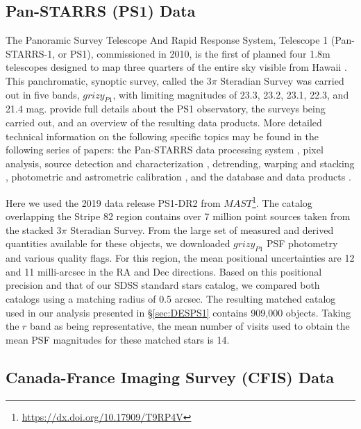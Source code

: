 \documentclass[fleqn,usenatbib]{mnras}
\begin{document}

\subsection{Pan-STARRS (PS1) Data} \label{ssec:ps1}
 
The Panoramic Survey Telescope And Rapid Response System, Telescope 1 (Pan-STARRS-1, or PS1), commissioned 
in 2010, is the first of planned four 1.8m telescopes designed to map three quarters of the entire sky visible from 
Hawaii \citep{2010SPIE.7733E..0EK}. This panchromatic, synoptic survey, called the 3$\pi$ Steradian Survey was 
carried out in five bands, $grizy_{P1}$, with limiting magnitudes of 23.3, 23.2, 23.1, 22.3, and 21.4 mag. 
\citet{2016arXiv161205560C} provide full details about the PS1 observatory, the surveys being carried out, and an overview of the resulting data products. More detailed technical information on the following specific topics may be found in the following series of papers: the Pan-STARRS data processing system \citep{Euge20a}, pixel analysis, source detection and characterization \citep{Euge20b}, detrending, warping and stacking \citep{Wate2020}, photometric and astrometric calibration \citep{Euge20c}, and the database and data products \citep{Flew2020}. 
 
Here we used the 2019 data release PS1-DR2 from $MAST$\footnote{\url{https://dx.doi.org/10.17909/T9RP4V}}. The catalog overlapping the Stripe 82 region contains over 7 million point sources taken from the stacked 3$\pi$ Steradian Survey. From the large set of measured and derived quantities available for these objects, we downloaded $grizy_{P1}$ PSF photometry and various quality flags. For this region, the mean positional uncertainties are 12 and 11 milli-arcsec in the RA and Dec directions. Based on this positional precision and that of our SDSS standard stars catalog, we compared both catalogs using a matching 
radius of 0.5 arcsec. The resulting matched catalog used in our analysis presented in \S \ref{sec:DESPS1} contains 
909,000 objects. Taking the $r$ band as being representative, the mean number of visits used to obtain the mean 
PSF magnitudes for these matched stars is 14. 


\subsection{Canada-France Imaging Survey (CFIS) Data} \label{ssec:cfis}
\end{document}
